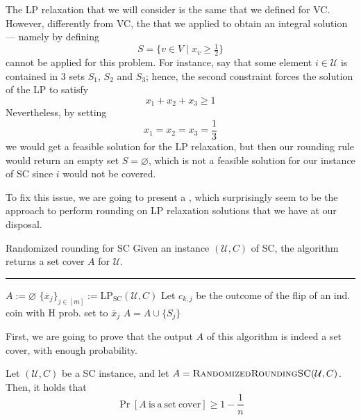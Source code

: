 \documentclass[a4paper, 12pt]{report}
\begin{document}
    The LP relaxation that we will consider is the same that we defined for VC. However, differently from VC, the  that we applied to obtain an integral solution --- namely by defining $$S = \{v \in V \mid x_v \ge \tfrac{1}{2}\}$$ cannot be applied for this problem. For instance, say that some element $i \in \mathcal U$ is contained in 3 sets $S_1$, $S_2$ and $S_3$; hence, the second constraint forces the solution of the LP to satisfy $$x_1 + x_2 + x_3 \ge 1$$ Nevertheless, by setting $$x_1 = x_2 = x_3 = \dfrac{1}{3}$$ we would get a feasible solution for the LP relaxation, but then our rounding rule would return an empty set $S = \varnothing$, which is not a feasible solution for our instance of SC since $i$ would not be covered.

    To fix this issue, we are going to present a , which surprisingly seem to be the  approach to perform rounding on LP relaxation solutions that we have at our disposal.

    \begin{framedalgo}{Randomized rounding for SC}
        Given an instance $(\mathcal U, C)$ of SC, the algorithm returns a set cover $A$ for $\mathcal U$. \\
        \hrule

        \quad
        \begin{algorithmic}[1]
                \State $A := \varnothing$
                \State $\{\overline x_j\}_{j \in [m]} := \mathrm{LP_{SC}}(\mathcal U, C)$ 
                        \State Let $c_{k, j}$ be the outcome of the flip of an ind. coin with H prob. set to $\overline x_j$
                            \State $A = A \cup \{S_j\}$
                        \EndIf
                    \EndFor
                \EndFor
            \EndFunction
        \end{algorithmic}
    \end{framedalgo}

    First, we are going to prove that the output $A$ of this algorithm is indeed a set cover, with enough probability.

    \begin{framedlem}{}
        Let $(\mathcal U, C)$ be a SC instance, and let $A = \textsc{RandomizedRoundingSC}(\mathcal U, C)$. Then, it holds that $$\Pr[A \ \mathrm{is \ a \ set \ cover}] \ge 1 - \dfrac{1}{n}$$
    \end{framedlem}
\end{document}
